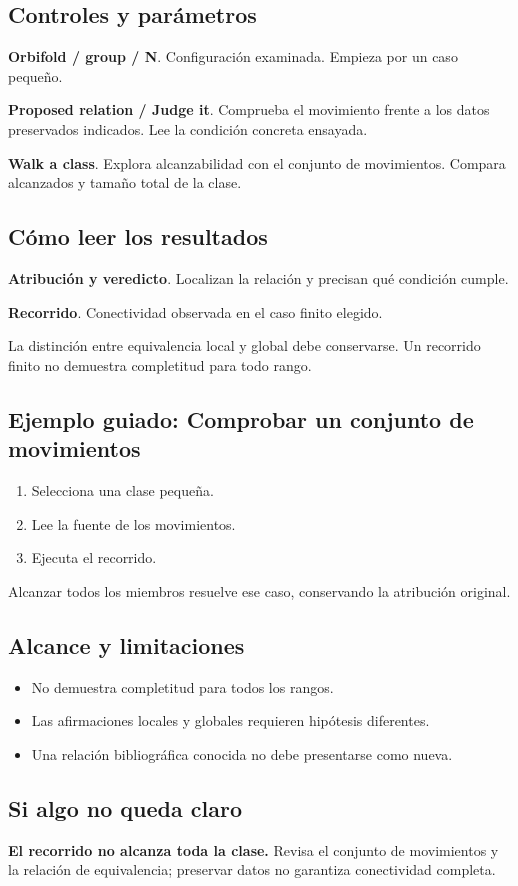 \documentclass[11pt,a4paper]{article}
\begin{document}
\subsection*{Controles y parámetros}
\textbf{Orbifold / group / N}. Configuración examinada. Empieza por un caso pequeño.

\textbf{Proposed relation / Judge it}. Comprueba el movimiento frente a los datos preservados indicados. Lee la condición concreta ensayada.

\textbf{Walk a class}. Explora alcanzabilidad con el conjunto de movimientos. Compara alcanzados y tamaño total de la clase.

\subsection*{Cómo leer los resultados}
\textbf{Atribución y veredicto}. Localizan la relación y precisan qué condición cumple.

\textbf{Recorrido}. Conectividad observada en el caso finito elegido.

La distinción entre equivalencia local y global debe conservarse. Un recorrido finito no demuestra completitud para todo rango.
\subsection*{Ejemplo guiado: Comprobar un conjunto de movimientos}
\begin{enumerate}
\item Selecciona una clase pequeña.
\item Lee la fuente de los movimientos.
\item Ejecuta el recorrido.
\end{enumerate}
Alcanzar todos los miembros resuelve ese caso, conservando la atribución original.
\subsection*{Alcance y limitaciones}
\begin{itemize}
\item No demuestra completitud para todos los rangos.
\item Las afirmaciones locales y globales requieren hipótesis diferentes.
\item Una relación bibliográfica conocida no debe presentarse como nueva.
\end{itemize}
\subsection*{Si algo no queda claro}
\textbf{El recorrido no alcanza toda la clase.} Revisa el conjunto de movimientos y la relación de equivalencia; preservar datos no garantiza conectividad completa.
\end{document}
